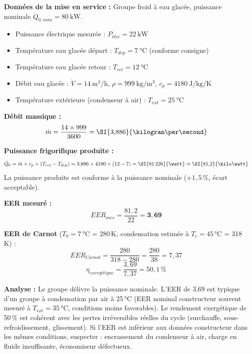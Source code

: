 \begin{exemple}[title=Diagnostic d'un groupe froid eau glacée et analyse d'écart EER]
\textbf{Données de la mise en service :} Groupe froid à eau glacée, puissance nominale $\dot{Q}_{0,nom} = \SI{80}{\kilo\watt}$.
\begin{itemize}
  \item Puissance électrique mesurée : $P_{élec} = \SI{22}{\kilo\watt}$
  \item Température eau glacée départ : $T_{dep} = \SI{7}{\degreeCelsius}$ (conforme consigne)
  \item Température eau glacée retour : $T_{ret} = \SI{12}{\degreeCelsius}$
  \item Débit eau glacée : $\dot{V} = \SI{14}{\cubic\metre\per\hour}$, $\rho = \SI{999}{\kilogram\per\cubic\metre}$, $c_p = \SI{4180}{\joule\per\kilogram\per\kelvin}$
  \item Température extérieure (condenseur à air) : $T_{ext} = \SI{25}{\degreeCelsius}$
\end{itemize}

\textbf{Débit massique :}
\[
  \dot{m} = \frac{14 \times 999}{3600} = \SI{3{,}886}{\kilogram\per\second}
\]

\textbf{Puissance frigorifique produite :}
\[
  \dot{Q}_0 = \dot{m} \times c_p \times (T_{ret} - T_{dep}) = 3{,}886 \times 4180 \times (12 - 7) = \SI{81\,226}{\watt} \approx \SI{81{,}2}{\kilo\watt}
\]
La puissance produite est conforme à la puissance nominale ($+1{,}5\,\%$, écart acceptable).

\textbf{EER mesuré :}
\[
  EER_{mes} = \frac{81{,}2}{22} = \mathbf{3{,}69}
\]

\textbf{EER de Carnot} ($T_0 = 7$\,°C = 280\,K, condensation estimée à $T_c = 45$\,°C = 318\,K) :
\[
  EER_{Carnot} = \frac{280}{318 - 280} = \frac{280}{38} = 7{,}37
\]
\[
  \eta_{exergétique} = \frac{3{,}69}{7{,}37} = 50{,}1\,\%
\]

\textbf{Analyse :} Le groupe délivre la puissance nominale. L'EER de 3,69 est typique d'un groupe à condensation par air à 25\,°C (EER nominal constructeur souvent mesuré à $T_{ext} = 35$\,°C, conditions moins favorables). Le rendement exergétique de 50\,\% est cohérent avec les pertes irréversibles réelles du cycle (surchauffe, sous-refroidissement, glissement). Si l'EER est inférieur aux données constructeur dans les mêmes conditions, suspecter : encrassement du condenseur à air, charge en fluide insuffisante, économiseur défectueux.
\end{exemple}

